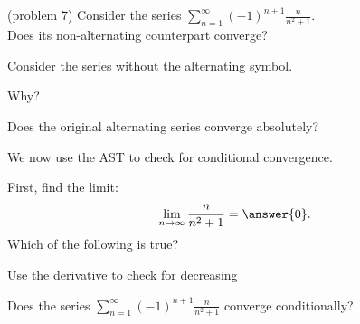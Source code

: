 \documentclass[handout]{ximera}
\begin{document}
\begin{problem}(problem 7)
Consider the series $\displaystyle{\sum_{n=1}^\infty (-1)^{n+1} \frac{n}{n^2 + 1}}$.\\
Does its non-alternating counterpart converge?
\begin{hint} 
Consider the series without the alternating symbol.
\end{hint}
\begin{multipleChoice}
\end{multipleChoice}

Why?
\begin{multipleChoice}
\end{multipleChoice}




Does the original alternating series converge absolutely?
\begin{multipleChoice}
\end{multipleChoice}

We now use the AST to check for conditional convergence.

First, find the limit:
\[
\lim_{n\to\infty} \frac{n}{n^2 + 1} = \answer{0}.
\]
Which of the following is true? 
\begin{hint}
Use the derivative to check for decreasing
\end{hint}
\begin{multipleChoice}
\end{multipleChoice}


Does the series $\displaystyle{\sum_{n=1}^\infty (-1)^{n+1} \frac{n}{n^2 + 1}}$ converge conditionally?
\begin{multipleChoice}
\end{multipleChoice}

\end{problem}
\end{document}
